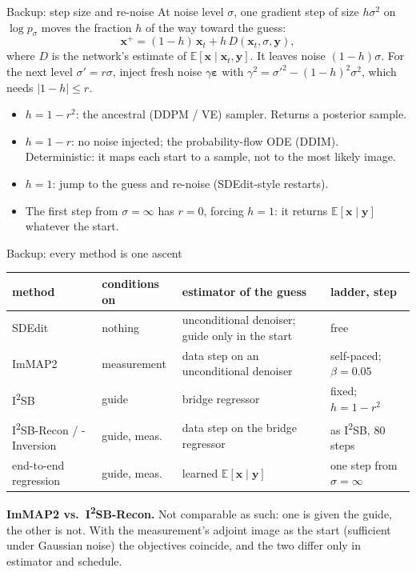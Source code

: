 \documentclass[aspectratio=169, 11pt]{beamer}
\newcommand{\x}{\bm{x}}
\newcommand{\y}{\bm{y}}
\newcommand{\eps}{\bm{\varepsilon}}
\newcommand{\E}{\mathbb{E}}
\newcommand{\D}{D}
\begin{document}
\begin{frame}{Backup: step size and re-noise}
\small
At noise level $\sigma$, one gradient step of size $h\sigma^2$ on $\log p_\sigma$ moves the
fraction $h$ of the way toward the guess:
\[
  \x^+ = (1-h)\,\x_t + h\,\D(\x_t,\sigma,\y),
\]
where $\D$ is the network's estimate of $\E[\x\mid\x_t,\y]$.
It leaves noise $(1-h)\sigma$. For the next level $\sigma' = r\sigma$, inject fresh noise
$\gamma\eps$ with $\gamma^2 = \sigma'^2 - (1-h)^2\sigma^2$, which needs $|1-h|\le r$.

\medskip
\begin{itemize}
  \setlength{\itemsep}{3pt}
  \item $h = 1-r^2$: the ancestral (DDPM / VE) sampler. Returns a posterior sample.
  \item $h = 1-r$: no noise injected; the probability-flow ODE (DDIM). Deterministic: it maps
        each start to a sample, not to the most likely image.
  \item $h = 1$: jump to the guess and re-noise (SDEdit-style restarts).
  \item The first step from $\sigma=\infty$ has $r=0$, forcing $h=1$: it returns
        $\E[\x\mid\y]$ whatever the start.
\end{itemize}
\end{frame}

\begin{frame}{Backup: every method is one ascent}
\footnotesize
\centering
\begin{tabular}{@{}>{\raggedright\arraybackslash}p{3.6cm}>{\raggedright\arraybackslash}p{2.0cm}%
                >{\raggedright\arraybackslash}p{4.4cm}>{\raggedright\arraybackslash}p{3.6cm}@{}}
\toprule
method & conditions on & estimator of the guess & ladder, step \\
\midrule
SDEdit & nothing & unconditional denoiser; guide only in the start & free \\
ImMAP2 & measurement & data step on an unconditional denoiser & self-paced; $\beta=0.05$ \\
I\textsuperscript{2}SB & guide & bridge regressor & fixed; $h = 1-r^2$ \\
I\textsuperscript{2}SB-Recon / -Inversion & guide, meas. & data step on the bridge regressor &
  as I\textsuperscript{2}SB, 80 steps \\
end-to-end regression & guide, meas. & learned $\E[\x\mid\y]$ & one step from $\sigma=\infty$ \\
\bottomrule
\end{tabular}

\bigskip
\raggedright
\small
\textbf{ImMAP2 vs.\ I\textsuperscript{2}SB-Recon.} Not comparable as such: one is given the guide,
the other is not. With the measurement's adjoint image as the start (sufficient under Gaussian
noise) the objectives coincide, and the two differ only in estimator and schedule.
\end{frame}

\end{document}
